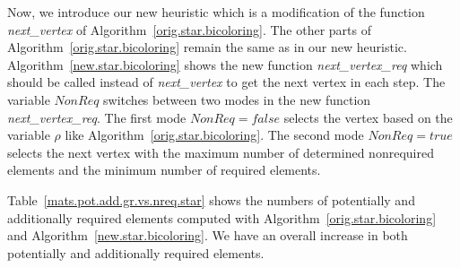 \documentclass[12pt, twoside,a4paper,toc=bibliography]{scrbook}
\newcommand{\coderef}[1]{Algorithm~\protect\ref{#1}}
\begin{document}
Now, we introduce our new heuristic  which is a modification of the function \textit{next\_vertex} 
of \coderef{orig.star.bicoloring}. The other parts of \coderef{orig.star.bicoloring} remain the same as
in our new heuristic.
\coderef{new.star.bicoloring} shows the new function \textit{next\_vertex\_req} which should be called
instead of \textit{next\_vertex} to get the next vertex in each step.
The variable $NonReq$ switches between two modes in the new function \textit{next\_vertex\_req}.
The first mode $NonReq=false$ selects the vertex 
based on the variable $\rho$ like \coderef{orig.star.bicoloring}. 
The second mode $NonReq=true$ selects
the next vertex with the maximum number of determined nonrequired elements
and the minimum number of required elements.

Table~\ref{mats.pot.add.gr.vs.nreq.star} shows the numbers of potentially and additionally required elements
computed with \coderef{orig.star.bicoloring} and \coderef{new.star.bicoloring}. 
We have an overall increase in both potentially and additionally required elements.
\end{document}
